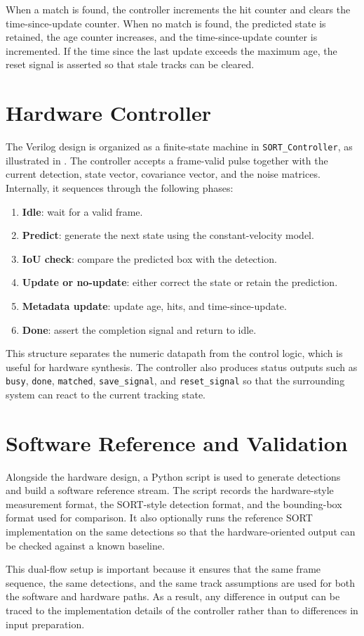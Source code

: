 When a match is found, the controller increments the hit counter and clears the 
time-since-update counter. When no match is found, the predicted state is retained, 
the age counter increases, and the time-since-update counter is incremented. If the 
time since the last update exceeds the maximum age, the reset signal is asserted so 
that stale tracks can be cleared.

\section{Hardware Controller}
The Verilog design is organized as a finite-state machine in \texttt{SORT\_Controller}, 
as illustrated in . 
The controller accepts a frame-valid pulse together with the current detection, state 
vector, covariance vector, and the noise matrices. Internally, it sequences through the 
following phases:

\begin{enumerate}
	\item \textbf{Idle}: wait for a valid frame.
	\item \textbf{Predict}: generate the next state using the constant-velocity model.
	\item \textbf{IoU check}: compare the predicted box with the detection.
	\item \textbf{Update or no-update}: either correct the state or retain the prediction.
	\item \textbf{Metadata update}: update age, hits, and time-since-update.
	\item \textbf{Done}: assert the completion signal and return to idle.
\end{enumerate}

This structure separates the numeric datapath from the control logic, which is useful 
for hardware synthesis. The controller also produces status outputs such as \texttt{busy}, 
\texttt{done}, \texttt{matched}, \texttt{save\_signal}, and \texttt{reset\_signal} so that 
the surrounding system can react to the current tracking state.

\section{Software Reference and Validation}
Alongside the hardware design, a Python script is used to generate detections and build 
a software reference stream. The script records the hardware-style measurement format, 
the SORT-style detection format, and the bounding-box format used for comparison. It also 
optionally runs the reference SORT implementation on the same detections so that the 
hardware-oriented output can be checked against a known baseline.

This dual-flow setup is important because it ensures that the same frame sequence, the 
same detections, and the same track assumptions are used for both the software and 
hardware paths. As a result, any difference in output can be traced to the implementation 
details of the controller rather than to differences in input preparation.